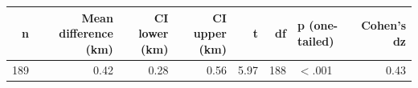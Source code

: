 \begingroup\footnotesize
\begin{tabular}{rrrrrrlr}
  \toprule
n & Mean difference (km) & CI lower (km) & CI upper (km) & t & df & p (one-tailed) & Cohen's dz \\ 
  \midrule
189 & 0.42 & 0.28 & 0.56 & 5.97 & 188 & $<$.001 & 0.43 \\ 
   \bottomrule
\end{tabular}
\endgroup
